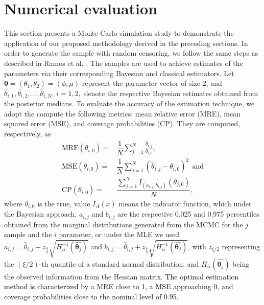 \documentclass[]{interact}
\theoremstyle{plain}%
\theoremstyle{definition}
\theoremstyle{remark}
\begin{document}
\section{Numerical evaluation}\label{sec:4}


This section presents a Monte Carlo simulation study to demonstrate the application of our proposed methodology derived in the preceding sections. In order to generate the sample with random censoring, we follow the same steps as described in Ramos et al. \cite{ramos2024sampling}. The samples are used to achieve estimates of the parameters via their corresponding Bayesian and classical estimators. Let \textcolor{black}{$\boldsymbol\theta=(\theta_1,\theta_2)=(\phi,\mu) $} represent the parameter vector of size \textcolor{black}{2}, and $\hat\theta_{i,1},\hat\theta_{i,2},\ldots,\hat\theta_{i,N}$, $i=1,2,$ denote the respective Bayesian estimates obtained from the posterior medians. To evaluate the accuracy of the estimation technique, we adopt the compute the following metrics: mean relative error (MRE), mean squared error (MSE), and coverage probabilities (CP). They are computed, respectively, as
\textcolor{black}{
\begin{align*}%
\text{MRE}(\theta_{i,0}) =& \dfrac{1}{N}\sum_{j=1}^{N}\frac{\hat\theta_{i,j}}{\theta_{i,0}}, \\ \text{MSE}(\theta_{i,0}) =& \dfrac{1}{N}\sum_{j=1}^{N}\left(\hat\theta_{i,j}-\theta_{i,0}\right)^2  \ \ \text{and}  \\ 
\text{CP}(\theta_{i,0})=&\dfrac{\sum_{j=1}^{N} I_{(a_{i,j},b_{i,j})}\left(\theta_{j,0}\right)}{N}, 
\end{align*}}
\noindent where $\theta_{i,0}$ is the true, value $I_{A}(x)$ means the indicator function, which under the Bayesian approach, $a_{i,j}$ and $b_{i,j}$ are the respective 0.025 and 0.975 percentiles obtained from the marginal distributions generated from the MCMC for the $j$ sample and the $i$ parameter, or under the MLE we used $a_{i,j}=\hat{\theta}_{i,j} - z_{\frac{\xi}{2}}\sqrt{H^{-1}_{ii}(\hat{\boldsymbol{\theta}_j})}$ and $b_{i,j}=\hat{\theta}_{i,j} + z_{\frac{\xi}{2}}\sqrt{H^{-1}_{ii}(\hat{\boldsymbol{\theta}_j})}$, with $z_{\xi/2}$ representing the $\left(\xi/2\right)$-th quantile of a standard normal distribution, and $H_{ii}(\hat{\boldsymbol{\theta}_j})$ being the observed information from the Hessian matrix. \textcolor{black}{The optimal estimation method is characterized by a MRE close to 1, a MSE approaching 0, and coverage probabilities close to the nominal level of 0.95.}
\end{document}
